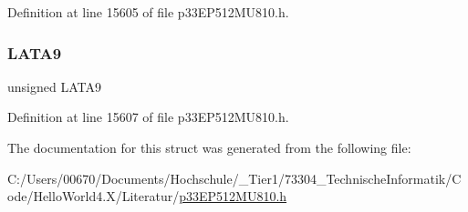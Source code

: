 Definition at line 15605 of file p33\+E\+P512\+M\+U810.\+h.

\mbox{\label{structtag_l_a_t_a_b_i_t_s_ae5e26b740e60e01bf7e0b52366f28c4c}} 
\subsubsection{\texorpdfstring{L\+A\+T\+A9}{LATA9}}
{\footnotesize\ttfamily unsigned L\+A\+T\+A9}



Definition at line 15607 of file p33\+E\+P512\+M\+U810.\+h.



The documentation for this struct was generated from the following file\+:\begin{DoxyCompactItemize}
\item 
C\+:/\+Users/00670/\+Documents/\+Hochschule/\+\_\+\+Tier1/73304\+\_\+\+Technische\+Informatik/\+Code/\+Hello\+World4.\+X/\+Literatur/\hyperlink{p33_e_p512_m_u810_8h}{p33\+E\+P512\+M\+U810.\+h}\end{DoxyCompactItemize}
